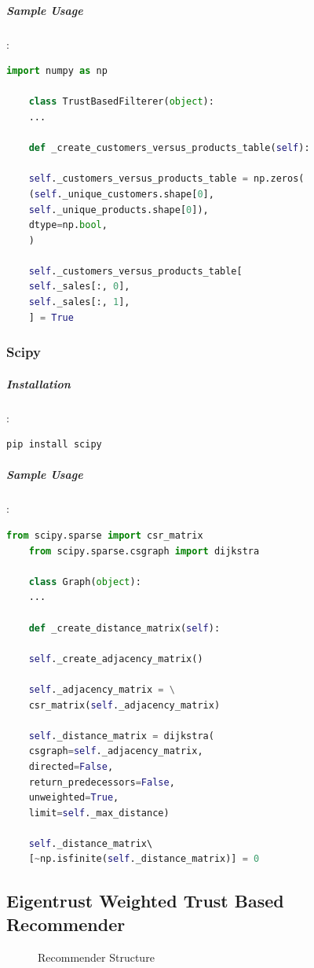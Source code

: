 \documentclass[12pt]{article}
\begin{document}
	\subparagraph{Sample Usage}:
	\begin{lstlisting}[language=python, caption=Numpy example]
	import numpy as np
	
	class TrustBasedFilterer(object):
	...
	
	def _create_customers_versus_products_table(self):
	
	self._customers_versus_products_table = np.zeros(
	(self._unique_customers.shape[0],
	self._unique_products.shape[0]),
	dtype=np.bool,
	)
	
	self._customers_versus_products_table[
	self._sales[:, 0],
	self._sales[:, 1],
	] = True
	\end{lstlisting}
	
	\subsubsection{Scipy}
	\subparagraph{Installation}:
	\begin{lstlisting}[language=bash]
	pip install scipy
	\end{lstlisting}
	
	\subparagraph{Sample Usage}:
	\begin{lstlisting}[language=python, caption=Scipy example]
	from scipy.sparse import csr_matrix
	from scipy.sparse.csgraph import dijkstra
	
	class Graph(object):
	...
	
	def _create_distance_matrix(self):
	
	self._create_adjacency_matrix()
	
	self._adjacency_matrix = \
	csr_matrix(self._adjacency_matrix)
	
	self._distance_matrix = dijkstra( 
	csgraph=self._adjacency_matrix, 
	directed=False, 
	return_predecessors=False, 
	unweighted=True,
	limit=self._max_distance)
	
	self._distance_matrix\ 
	[~np.isfinite(self._distance_matrix)] = 0
	\end{lstlisting}
	
	
	\subsection{Eigentrust Weighted Trust Based Recommender}
	\begin{figure}[H]
		\centering
		\caption{Recommender Structure}
	\end{figure}
\end{document}

